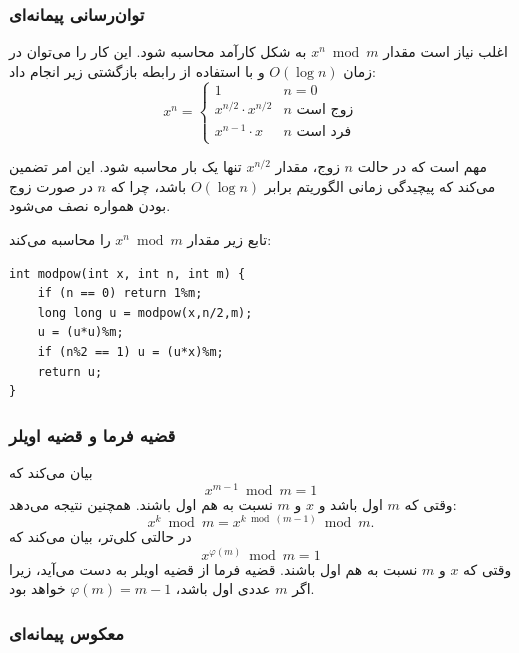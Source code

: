 \subsubsection{توان‌رسانی پیمانه‌ای}

اغلب نیاز است مقدار $x^n \bmod m$
به شکل کارآمد محاسبه شود.
این کار را می‌توان در زمان $O(\log n)$
و با استفاده از رابطه بازگشتی زیر انجام داد:
\begin{equation*}
    x^n = \begin{cases}
               1        & n = 0\\
               x^{n/2} \cdot x^{n/2} & \text{$n$ زوج است}\\
               x^{n-1} \cdot x & \text{$n$ فرد است}
           \end{cases}
\end{equation*}

مهم است که در حالت $n$ زوج،
مقدار $x^{n/2}$ تنها یک بار محاسبه شود.
این امر تضمین می‌کند که پیچیدگی زمانی الگوریتم
برابر $O(\log n)$ باشد، چرا که $n$ در صورت زوج بودن همواره نصف می‌شود.

تابع زیر مقدار $x^n \bmod m$ را محاسبه می‌کند:

\begin{lstlisting}
int modpow(int x, int n, int m) {
    if (n == 0) return 1%m;
    long long u = modpow(x,n/2,m);
    u = (u*u)%m;
    if (n%2 == 1) u = (u*x)%m;
    return u;
}
\end{lstlisting}

\subsubsection{قضیه فرما و قضیه اویلر}


بیان می‌کند که
\[x^{m-1} \bmod m = 1\]
وقتی که $m$ اول باشد و $x$ و $m$ نسبت به هم اول باشند.
همچنین نتیجه می‌دهد:
\[x^k \bmod m = x^{k \bmod (m-1)} \bmod m.\]
در حالتی کلی‌تر، 
بیان می‌کند که
\[x^{\varphi(m)} \bmod m = 1\]
وقتی که $x$ و $m$ نسبت به هم اول باشند.
قضیه فرما از قضیه اویلر به دست می‌آید،
زیرا اگر $m$ عددی اول باشد، $\varphi(m)=m-1$ خواهد بود.

\subsubsection{معکوس پیمانه‌ای}

